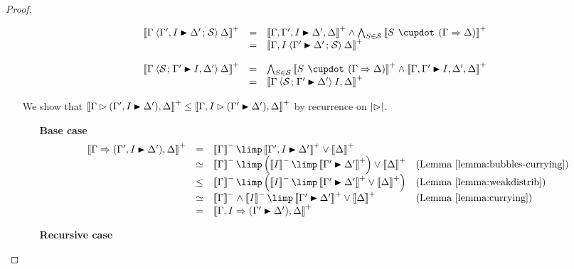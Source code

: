 \begin{proof}
\begin{itemize}
    \item[{\rnmsf{f{-}{\downarrow}}}]
    $$
    \begin{array}{rcll}
      \psint{\Gamma \piq{\Gamma', I \JB \Delta' \sep \cS} \Delta}
      &=& \psint{\Gamma, \Gamma', I \JB \Delta', \Delta} \land \bigwedge_{S \in \cS}{\psint{S \mix (\Gamma \seq \Delta)}} & \\
      &=& \psint{\Gamma, I \piq{\Gamma' \JB \Delta' \sep \cS} \Delta} & \\
    \end{array}
    $$
    \item[{\rnmsf{f{+}{\downarrow}}}]
    $$
    \begin{array}{rcll}
      \psint{\Gamma \piq{\cS \sep \Gamma' \JB I, \Delta'} \Delta}
      &=& \bigwedge_{S \in \cS}{\psint{S \mix (\Gamma \seq \Delta)}} \land \psint{\Gamma, \Gamma' \JB I, \Delta', \Delta} & \\
      &=& \psint{\Gamma \piq{\cS \sep \Gamma' \JB \Delta'} I, \Delta} & \\
    \end{array}
    $$
    \item[{\rnmsf{f{-}{+}{\downarrow}}}]
    We show that $\psint{\Gamma \J (\Gamma', I \JB \Delta'), \Delta} \sement
    \psint{\Gamma, I \J (\Gamma' \JB \Delta'), \Delta}$ by recurrence on
    $\left|\mathbin{\rhd}\right|$.
    \begin{itemize}
      \item[\textbf{Base case}]
      $$
      \begin{array}{rcll}
        \psint{\Gamma \seq (\Gamma', I \JB \Delta'), \Delta}
        &=& \nsint{\Gamma} \limp \psint{\Gamma', I \JB \Delta'} \lor \psint{\Delta} & \\
        &\semequiv& \nsint{\Gamma} \limp \left(\nsint{I} \limp \psint{\Gamma' \JB \Delta'}\right) \lor \psint{\Delta} &\text{(\reflemma{bubbles-currying})} \\
        &\sement& \nsint{\Gamma} \limp \left(\nsint{I} \limp \psint{\Gamma' \JB \Delta'} \lor \psint{\Delta}\right) &\text{(\reflemma{weakdistrib})} \\
        &\semequiv& \nsint{\Gamma} \land \nsint{I} \limp \psint{\Gamma' \JB \Delta'} \lor \psint{\Delta} &\text{(\reflemma{currying})} \\
        &=& \psint{\Gamma, I \seq (\Gamma' \JB \Delta'), \Delta} & \\
      \end{array}
      $$
      \item[\textbf{Recursive case}]
      $$
$$
\end{itemize}
\end{itemize}
\end{proof}
